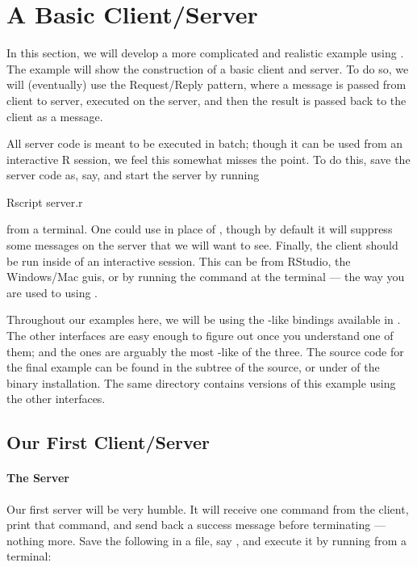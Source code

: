 \section[A Basic Client/Server]{A Basic Client/Server}
\label{sec:cs}


In this section, we will develop a more complicated and realistic example using
.  The example will show the construction of a basic client and
server.  To do so, we will (eventually) use the Request/Reply pattern, where a
message is passed from client to server, executed on the server, and then the
result is passed back to the client as a message.

All server code is meant to be executed in
batch; though it can be used from an interactive R session, we feel this
somewhat misses the point.  To do this, save the server code as, say,
 and start the server by running
\begin{Command}
Rscript server.r
\end{Command}
from a terminal.  One could use  in place of , 
though by default it will suppress some messages on the server that we will 
want to see.  Finally, the client should be run inside of an interactive
 session.  This can be from RStudio, the Windows/Mac 
guis, or by running the command  at the terminal --- the way you are
used to using .

Throughout our examples here, we will be using the -like bindings 
available in .  The other interfaces are easy enough to figure out
once you understand one of them; and the  ones are arguably the most
-like of the three.
The source code for the final example can be found in the 
 subtree of the  source, or under
 of the binary installation.  The same directory
contains versions of this example using the other  interfaces.


\subsection{Our First Client/Server}

\paragraph{The Server}
Our first server will be very humble.  It will receive one command from the
client, print that command, and send back a success message before terminating
--- nothing  more.  Save the following in a file, say , and
execute it by running  from a terminal:

